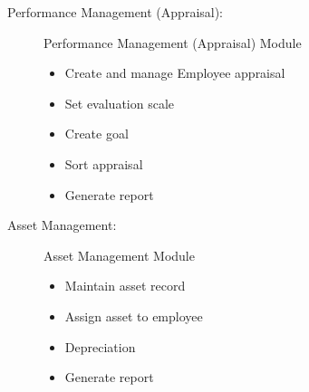 \begin{description}
 	\item[Performance Management (Appraisal):] Performance Management (Appraisal) Module
	\begin{itemize}
		\item Create and manage Employee appraisal 
		\item Set evaluation scale
		\item Create goal
		\item Sort appraisal
		\item Generate report
 	\end{itemize}
 	
 	\item[Asset Management:] Asset Management Module
	\begin{itemize}
		\item Maintain asset record 
		\item Assign asset to employee
		\item Depreciation
		\item Generate report
 	\end{itemize}
\end{description}
